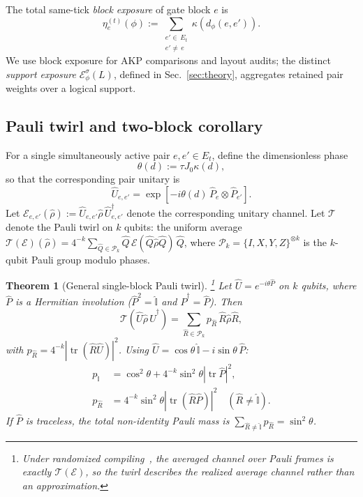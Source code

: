 \documentclass[
aps,
prx,
10pt,
twocolumn,
groupedaddress,
longbibliography,
nofootinbib,
floatfix
]{revtex4-2}
\newtheorem{theorem}{Theorem}
\theoremstyle{definition}
\newcommand{\Ew}{\mathcal{E}}
\begin{document}
The total same-tick \emph{block exposure} of gate block $e$ is
\begin{equation}
\eta_e^{(t)}(\phi)  := \sum_{\substack{e'\in \,E_t \\ e'\neq \,e}}\kappa\left(d_{\phi}(e,e')\right).
\label{eq:eta-main}
\end{equation}
We use block exposure for AKP comparisons and layout audits; the distinct \emph{support exposure} $\Ew_\phi^\sigma(L)$, defined in Sec.~\ref{sec:theory}, aggregates retained pair weights over a logical support.

\subsection{Pauli twirl and two-block corollary}

For a single simultaneously active pair $e,e'\in E_t$, define the dimensionless phase
\begin{equation}
\theta(d):=\tau J_0\kappa(d),
\end{equation}
so that the corresponding pair unitary is
\begin{equation}
\hat U_{e,e'}=\exp\left[-i\theta(d)\,\hat P_e\otimes\hat P_{e'}\right].
\label{eq:block-unitary}
\end{equation}
Let $\mathcal E_{e,e'}(\hat\rho):=\hat U_{e,e'}\hat\rho\,\hat U_{e,e'}^{\dagger}$ denote the corresponding unitary channel. Let $\mathcal T$ denote the Pauli twirl on $k$ qubits: the uniform average $\mathcal T(\mathcal E)(\hat\rho)=4^{-k}\sum_{\hat Q\in\mathcal P_k}\hat Q\,\mathcal E(\hat Q\hat\rho\hat Q)\,\hat Q$, where $\mathcal P_k=\{I,X,Y,Z\}^{\otimes k}$ is the $k$-qubit Pauli group modulo phases.

\begin{theorem}[General single-block Pauli twirl]\footnote{Under randomized compiling~\cite{wallman_emerson_2016}, the averaged channel over Pauli frames is exactly $\mathcal T(\mathcal E)$, so the twirl describes the realized average channel rather than an approximation.}
\label{thm:general-twirl}
Let $\hat U=e^{-i\theta \hat P}$ on $k$ qubits, where $\hat P$ is a Hermitian involution ($\hat P^2=\hat{\mathbb{I}}$ and $\hat P^{\dagger}=\hat P$). Then
\begin{equation}
\mathcal T\left(\hat U\hat\rho\,\hat U^{\dagger}\right)=\sum_{\hat R\in\mathcal P_k}p_{\hat R}\,\hat R\hat\rho\hat R,
\label{eq:general-twirl}
\end{equation}
with $p_{\hat R}=4^{-k}\left|\operatorname{tr}\left(\hat R\hat U\right)\right|^2$. Using $\hat U=\cos\theta\,\hat{\mathbb{I}}-i\sin\theta\,\hat P$:
\begin{align}
p_{\hat{\mathbb{I}}}&=\cos^2\theta+4^{-k}\sin^2\theta\left|\operatorname{tr}\hat P\right|^2,\label{eq:pI}\\
p_{\hat R}&=4^{-k}\sin^2\theta\left|\operatorname{tr}\left(\hat R\hat P\right)\right|^2\quad(\hat R\neq\hat{\mathbb{I}}).\label{eq:pR}
\end{align}
If $\hat P$ is traceless, the total non-identity Pauli mass is $\sum_{\hat R\neq\hat{\mathbb{I}}}p_{\hat R}=\sin^2\theta$.
\end{theorem}
\end{document}
